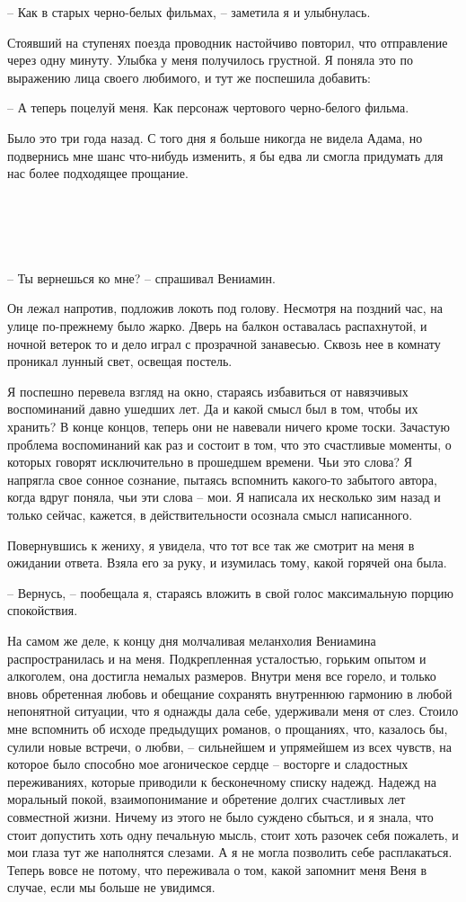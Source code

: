 \documentclass[
]{book}
\begin{document}
-- Как в старых черно-белых фильмах, -- заметила я и улыбнулась.

Стоявший на ступенях поезда проводник настойчиво повторил, что отправление через одну минуту. Улыбка у меня получилось грустной. Я поняла это по выражению лица своего любимого, и тут же поспешила добавить:

-- А теперь поцелуй меня. Как персонаж чертового черно-белого фильма.

Было это три года назад. С того дня я больше никогда не видела Адама, но подвернись мне шанс что-нибудь изменить, я бы едва ли смогла придумать для нас более подходящее прощание.

\hypertarget{chapter-34}{%
\chapter{~}\label{chapter-34}}

-- Ты вернешься ко мне? -- спрашивал Вениамин.

Он лежал напротив, подложив локоть под голову. Несмотря на поздний час, на улице по-прежнему было жарко. Дверь на балкон оставалась распахнутой, и ночной ветерок то и дело играл с прозрачной занавесью. Сквозь нее в комнату проникал лунный свет, освещая постель.

Я поспешно перевела взгляд на окно, стараясь избавиться от навязчивых воспоминаний давно ушедших лет. Да и какой смысл был в том, чтобы их хранить? В конце концов, теперь они не навевали ничего кроме тоски. Зачастую проблема воспоминаний как раз и состоит в том, что это счастливые моменты, о которых говорят исключительно в прошедшем времени. Чьи это слова? Я напрягла свое сонное сознание, пытаясь вспомнить какого-то забытого автора, когда вдруг поняла, чьи эти слова -- мои. Я написала их несколько зим назад и только сейчас, кажется, в действительности осознала смысл написанного.

Повернувшись к жениху, я увидела, что тот все так же смотрит на меня в ожидании ответа. Взяла его за руку, и изумилась тому, какой горячей она была.

-- Вернусь, -- пообещала я, стараясь вложить в свой голос максимальную порцию спокойствия.

На самом же деле, к концу дня молчаливая меланхолия Вениамина распространилась и на меня. Подкрепленная усталостью, горьким опытом и алкоголем, она достигла немалых размеров. Внутри меня все горело, и только вновь обретенная любовь и обещание сохранять внутреннюю гармонию в любой непонятной ситуации, что я однажды дала себе, удерживали меня от слез. Стоило мне вспомнить об исходе предыдущих романов, о прощаниях, что, казалось бы, сулили новые встречи, о любви, -- сильнейшем и упрямейшем из всех чувств, на которое было способно мое агоническое сердце -- восторге и сладостных переживаниях, которые приводили к бесконечному списку надежд. Надежд на моральный покой, взаимопонимание и обретение долгих счастливых лет совместной жизни. Ничему из этого не было суждено сбыться, и я знала, что стоит допустить хоть одну печальную мысль, стоит хоть разочек себя пожалеть, и мои глаза тут же наполнятся слезами. А я не могла позволить себе расплакаться. Теперь вовсе не потому, что переживала о том, какой запомнит меня Веня в случае, если мы больше не увидимся.
\end{document}
